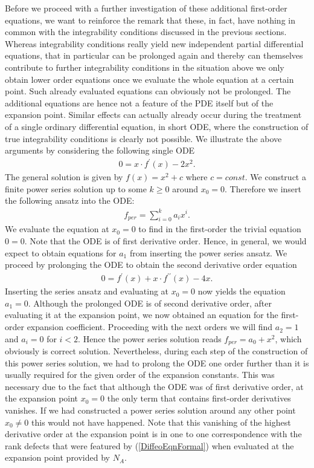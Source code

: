 \documentclass[a4paper,12pt, DIV=14, BCOR=5mm, twoside, headsepline, numbers=noenddot]{scrbook}
\begin{document}
Before we proceed with a further investigation of these additional first-order equations, we want to reinforce the remark that these, in fact, have nothing in common with the integrability conditions discussed in the previous sections. Whereas integrability conditions really yield new independent partial differential equations, that in particular can be prolonged again and thereby can themselves contribute to further integrability conditions in the situation above we only obtain lower order equations once we evaluate the whole equation at a certain point. Such already evaluated equations can obviously not be prolonged. The additional equations are hence not a feature of the PDE itself but of the expansion point. Similar effects can actually already occur during the treatment of a single ordinary differential equation, in short ODE, where the construction of true integrability conditions is clearly not possible. We illustrate the above arguments by considering the following single ODE
\begin{align}
    0 = x \cdot f^{\prime}(x) - 2x^2.
\end{align}
The general solution is given by $f(x) = x^2 +c$ where $c=const$. We construct a finite power series solution up to some $k \geq 0$ around $x_0 = 0$. Therefore we insert the following ansatz into the ODE:
\begin{align}
    f_{per} = \sum_{i=0}^k a_i x^i.
\end{align}
We evaluate the equation at $x_0=0$ to find in the first-order the trivial equation $0=0$. Note that the ODE is of first derivative order. Hence, in general, we would expect to obtain equations for $a_1$ from inserting the power series ansatz. We proceed by prolonging the ODE to obtain the second derivative order equation
\begin{align}
    0 = f^{\prime}(x) + x \cdot f^{\prime \prime}(x) - 4 x.
\end{align}
Inserting the series ansatz and evaluating at $x_0=0$ now yields the equation $a_1=0$. Although the prolonged ODE is of second derivative order, after evaluating it at the expansion point, we now obtained an equation for the first-order expansion coefficient. Proceeding with the next orders we will find $a_2 = 1$ and $a_i = 0$ for $i < 2$. Hence the power series solution reads $f_{per} = a_0 + x^2$, which obviously is correct solution. Nevertheless, during each step of the construction of this power series solution, we had to prolong the ODE one order further than it is usually required for the given order of the expansion constants. This was necessary due to the fact that although the ODE was of first derivative order, at the expansion point $x_0=0$ the only term that contains first-order derivatives vanishes. If we had constructed a power series solution around any other point $x_0 \neq 0$ this would not have happened. Note that this vanishing of the highest derivative order at the expansion point is in one to one correspondence with the rank defects that were featured by (\ref{DiffeoEqnFormal}) when evaluated at the expansion point provided by $N_A$. 
\end{document}
